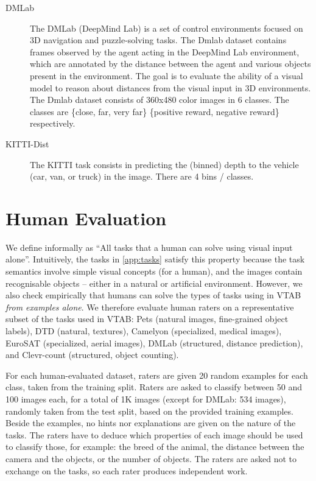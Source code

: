 \documentclass{article}
\begin{document}
\begin{description}
    \item[DMLab] \citep{beattie2016deepmind} The DMLab (DeepMind Lab) is a set of control environments focused on 3D navigation and puzzle-solving tasks.
    The Dmlab dataset contains frames observed by the agent acting in the DeepMind Lab environment,
    which are annotated by the distance between the agent and various objects present in the environment.
    The goal is to evaluate the ability of a visual model to reason about distances from the visual input in 3D environments.
    The Dmlab dataset consists of 360x480 color images in 6 classes.
    The classes are \{close, far, very far\}  \{positive reward, negative reward\} respectively.
    \item[KITTI-Dist] \citep{Geiger2013IJRR} The KITTI task consists in predicting the (binned) depth to the vehicle (car, van, or truck)  in the image. There are 4 bins / classes.
\end{description}

\clearpage
\section{Human Evaluation \label{app:human}}

We define  informally as ``All tasks that a human can solve using visual input alone''. Intuitively, the tasks in \cref{app:tasks} satisfy this property because the task semantics involve simple visual concepts (for a human), and the images contain recognisable objects -- either in a natural or artificial environment. However, we also check empirically that humans can solve the types of tasks using in VTAB \emph{from examples alone}. We therefore evaluate human raters on a representative subset of the tasks used in VTAB: Pets (natural images, fine-grained object labels), DTD (natural, textures), Camelyon (specialized, medical images), EuroSAT (specialized, aerial images), DMLab (structured, distance prediction), and Clevr-count (structured, object counting). 

For each human-evaluated dataset, raters are given 20 random examples for each class, taken from the training split. Raters are asked to classify between 50 and 100 images each, for a total of 1K images (except for DMLab: 534 images), randomly taken from the test split, based on the provided training examples. Beside the examples, no hints nor explanations are given on the nature of the tasks. The raters have to deduce which properties of each image should be used to classify those, for example: the breed of the animal, the distance between the camera and the objects, or the number of objects. The raters are asked not to exchange on the tasks, so each rater produces independent work. 
\end{document}
